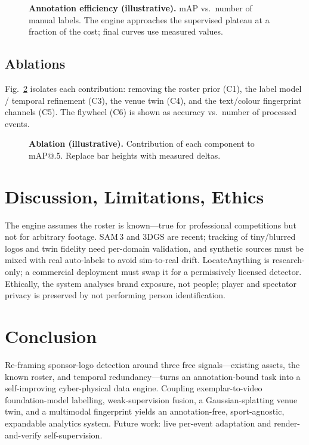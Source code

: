 \documentclass[conference]{IEEEtran}
\begin{document}
\begin{figure}[t]
\centering

\caption{\textbf{Annotation efficiency (illustrative).} mAP vs.\ number of manual
labels. The engine approaches the supervised plateau at a fraction of the cost;
final curves use measured values.}
\label{fig:eff}
\end{figure}

\subsection{Ablations}
Fig.~\ref{fig:ablation} isolates each contribution: removing the roster prior
(C1), the label model / temporal refinement (C3), the venue twin (C4), and the
text/colour fingerprint channels (C5). The flywheel (C6) is shown as accuracy vs.\
number of processed events.

\begin{figure}[t]
\centering

\caption{\textbf{Ablation (illustrative).} Contribution of each component to
mAP@.5. Replace bar heights with measured deltas.}
\label{fig:ablation}
\end{figure}

\section{Discussion, Limitations, Ethics}
The engine assumes the roster is known---true for professional competitions but
not for arbitrary footage. SAM\,3 and 3DGS are recent; tracking of tiny/blurred
logos and twin fidelity need per-domain validation, and synthetic sources must be
mixed with real auto-labels to avoid sim-to-real drift. LocateAnything is
research-only; a commercial deployment must swap it for a permissively licensed
detector. Ethically, the system analyses brand exposure, not people; player and
spectator privacy is preserved by not performing person identification.

\section{Conclusion}
Re-framing sponsor-logo detection around three free signals---existing assets, the
known roster, and temporal redundancy---turns an annotation-bound task into a
self-improving cyber-physical data engine. Coupling exemplar-to-video
foundation-model labelling, weak-supervision fusion, a Gaussian-splatting venue
twin, and a multimodal fingerprint yields an annotation-free, sport-agnostic,
expandable analytics system. Future work: live per-event adaptation and
render-and-verify self-supervision.



\end{document}
